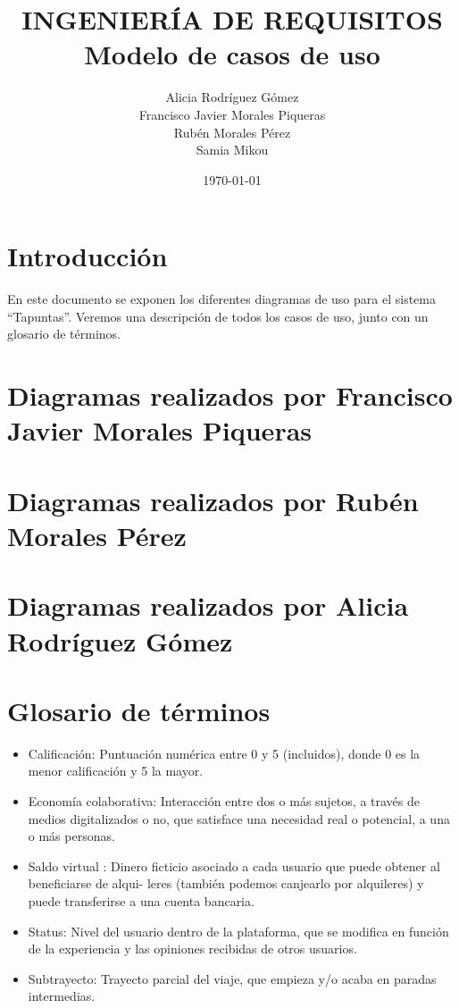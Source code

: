 \documentclass[11pt,spanish]{article} %
\title{INGENIERÍA DE REQUISITOS \\
	Modelo de casos de uso}
\author{Alicia Rodríguez Gómez \\
	Francisco Javier Morales Piqueras \\
	Rubén Morales Pérez \\
	Samia Mikou}
\date{\today}
\begin{document}
\maketitle
\tableofcontents %
\setlength\parindent{0pt} %

\vspace{5cm}
\section{Introducción}
En este documento se exponen los diferentes diagramas de uso  para el sistema “Tapuntas”. Veremos una descripción de todos los casos de uso, junto con un glosario de términos.



\section{Diagramas realizados por Francisco Javier Morales Piqueras}


\newpage


\section{Diagramas realizados por Rubén Morales Pérez}


\newpage

\section{Diagramas realizados por Alicia Rodríguez Gómez}


\newpage


\section{Glosario de términos}
\begin{itemize}
	\item Calificación: Puntuación numérica entre 0 y 5 (incluidos), donde 0 es la menor calificación y 5
la mayor.
	\item Economía colaborativa: Interacción entre dos o más sujetos, a través de medios digitalizados o
no, que satisface una necesidad real o potencial, a una o más personas.
	\item Saldo virtual : Dinero ficticio asociado a cada usuario que puede obtener al beneficiarse de alqui-
leres (también podemos canjearlo por alquileres) y puede transferirse a una cuenta bancaria.
	\item Status: Nivel del usuario dentro de la plataforma, que se modifica en función de la experiencia
y las opiniones recibidas de otros usuarios.
	\item Subtrayecto: Trayecto parcial del viaje, que empieza y/o acaba en paradas intermedias.
\end{itemize}


\end{document}
